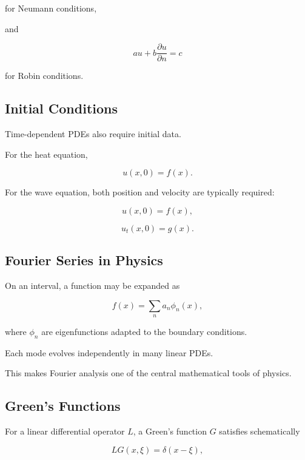 for Neumann conditions,

and

\[
\boxed{
au+b\frac{\partial u}{\partial n}=c
}
\]

for Robin conditions.

\subsection{Initial Conditions}
\label{subsec:physical-initial-conditions}

Time-dependent PDEs also require initial data.

For the heat equation,

\[
\boxed{
u(x,0)=f(x).
}
\]

For the wave equation, both position and velocity are typically required:

\[
\boxed{
u(x,0)=f(x),
}
\]

\[
\boxed{
u_t(x,0)=g(x).
}
\]

\subsection{Fourier Series in Physics}
\label{subsec:fourier-series-physics}

On an interval, a function may be expanded as

\[
\boxed{
f(x)
=
\sum_{n}
a_n\phi_n(x),
}
\]

where \(\phi_n\) are eigenfunctions adapted to the boundary conditions.

Each mode evolves independently in many linear PDEs.

This makes Fourier analysis one of the central mathematical tools of
physics.

\subsection{Green's Functions}
\label{subsec:greens-functions-physics}

For a linear differential operator \(L\), a Green's function \(G\) satisfies
schematically

\[
\boxed{
L G(x,\xi)
=
\delta(x-\xi),
}
\]

